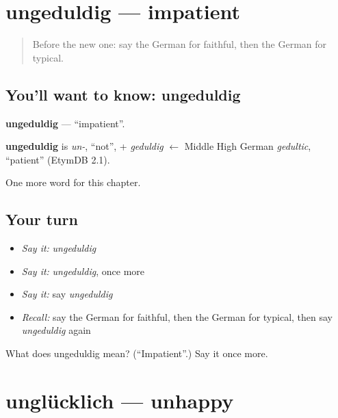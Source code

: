 \section[ungeduldig]{ungeduldig — impatient}

\label{lesson:GE-C223-ungeduldig}



\begin{quote}
Before the new one: say the German for faithful, then the German for typical.
\end{quote}

\subsection*{You'll want to know: ungeduldig}
\textbf{ungeduldig} — \textquotedblleft{}impatient\textquotedblright{}.

\begin{cousinweb}
\textbf{ungeduldig} is \emph{un-}, \textquotedblleft{}not\textquotedblright{}, + \emph{geduldig} $\leftarrow$ Middle High German \emph{gedultic}, \textquotedblleft{}patient\textquotedblright{} (EtymDB 2.1).
\end{cousinweb}

\begin{grammarlens}[title={What you've built}]
One more word for this chapter.
\end{grammarlens}

\subsection*{Your turn}
\begin{itemize}
\raggedright
  \item \emph{Say it:} \emph{ungeduldig}
  \item \emph{Say it:} \emph{ungeduldig}, once more
  \item \emph{Say it:} say \emph{ungeduldig}
  \item \emph{Recall:} say the German for faithful, then the German for typical, then say \emph{ungeduldig} again
\end{itemize}

\begin{tcolorbox}[breakable,colback=teal!4,colframe=teal!35!black,title={Before you move on}]
What does ungeduldig mean? (\textquotedblleft{}Impatient\textquotedblright{}.) Say it once more.
\end{tcolorbox}
\section[unglücklich]{unglücklich — unhappy}

